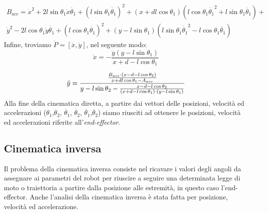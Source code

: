 \begin{equation*}
    \begin{aligned}
    B_{acc} = \dot{x}^2+2l\sin\theta_1\dot{x}\dot{\theta_1} + (l\sin\theta_1\dot{\theta_1})^2+(x+dl\cos\theta_1)(l\cos\theta_1\dot{\theta_1}^2+l\sin\theta_1\ddot{\theta_1})+
    \\ \dot{y}^2 -2l\cos\theta_1 \dot{y}\dot{\theta_1}+(l\cos\theta_1\dot{\theta_1})^2+(y-l\sin\theta_1)(l\sin\theta_1\dot{\theta_1}^2-l\cos\theta_1\ddot{\theta_1})
    \end{aligned}
\end{equation*}
Infine, troviamo $\ddot{P} = [\ddot{x},\ddot{y}]$, nel seguente modo:
\begin{equation}
	\ddot{x} = - \frac{\ddot{y}(y-l\sin\theta_1)}{x+d-l\cos\theta_1}
\end{equation}

\begin{equation}
	\large
     \ddot{y} = \frac{\frac{B_{acc}\cdot(x-d-l\cos\theta_2)}{x+dl\cos\theta_1-A_{acc}}}{y-l\sin\theta_2-\frac{x-d-l\cos\theta_2}{(x+d-l\cos\theta_1)\cdot(y-l\sin\theta_1)}}
\end{equation}
Alla fine della cinematica diretta, a partire dai vettori delle posizioni, velocità ed accelerazioni ($\theta_1$,$\theta_2$, $\dot{\theta_1}$, $\dot{\theta_2}$, $\ddot{\theta_1}$,$\ddot{\theta_2}$) siamo riusciti ad ottenere le posizioni, velocità ed accelerazioni riferite all'\textit{end-effector}.
\subsection{Cinematica inversa}
Il problema della cinematica inversa consiste nel ricavare i valori degli angoli da assegnare ai parametri del robot per riuscire a seguire una determinata legge di moto o traiettoria a partire dalla posizione alle estremità, in questo caso l'end-effector. Anche l'analisi della cinematica inversa è stata fatta per posizione, velocità ed accelerazione.
